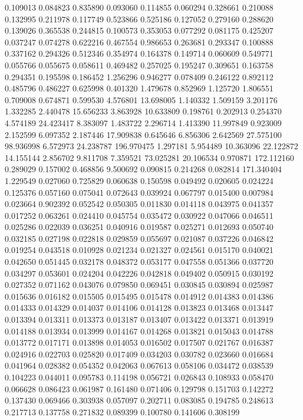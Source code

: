 0.109013
0.084823
0.835890
0.093060
0.114855
0.060294
0.328661
0.210088
0.132995
0.211978
0.117749
0.523866
0.525186
0.127052
0.279160
0.288620
0.139026
0.365538
0.244815
0.100573
0.353053
0.077292
0.081175
0.425207
0.037247
0.074278
0.622216
0.467554
0.986653
0.263681
0.293347
0.100888
0.337162
0.294326
0.512346
0.354974
0.164378
0.149714
0.060609
0.549771
0.055766
0.055675
0.058611
0.469482
0.257025
0.195247
0.309651
0.163758
0.294351
0.195598
0.186452
1.256296
0.946277
0.078409
0.246122
0.892112
0.485796
0.486227
0.625998
0.401320
1.479678
0.852969
1.125720
1.806551
0.709008
0.674871
0.599530
4.576801
13.698005
1.140332
1.509159
3.201176
1.332285
2.440478
15.656233
3.863928
10.633809
0.198761
0.202913
0.254370
4.574189
24.423417
8.383097
1.483722
2.296714
1.413390
11.997849
0.923009
2.152599
6.097352
2.187446
17.909838
0.645646
6.856306
2.642569
27.575100
98.936998
6.572973
24.238787
196.970475
1.297181
5.954489
10.363096
22.122872
14.155144
2.856702
9.811708
7.359521
73.025281
20.106534
0.970871
172.112160
0.289029
0.157002
0.468856
9.500692
0.090815
0.214268
0.082814
171.340404
1.229549
0.027060
0.725829
0.060638
0.150598
0.049492
0.020605
0.024224
0.125376
0.057160
0.075041
0.072643
0.039924
0.067797
0.015400
0.007984
0.023664
0.902392
0.052542
0.050305
0.011830
0.014118
0.043975
0.041357
0.017252
0.063261
0.024410
0.045754
0.035472
0.030922
0.047066
0.046511
0.025286
0.022039
0.036251
0.040916
0.019587
0.025271
0.012693
0.050740
0.032185
0.027198
0.022818
0.029859
0.055697
0.021087
0.037226
0.046842
0.019254
0.043518
0.010928
0.021234
0.021327
0.024561
0.015170
0.040021
0.042650
0.051445
0.032178
0.048372
0.053177
0.047558
0.051366
0.037720
0.034297
0.053601
0.024204
0.042226
0.042818
0.049402
0.050915
0.030192
0.027352
0.071162
0.043076
0.079850
0.069451
0.030845
0.030894
0.025987
0.015636
0.016182
0.015505
0.015495
0.015478
0.014912
0.014383
0.014386
0.014333
0.014329
0.014037
0.014106
0.014128
0.013823
0.013468
0.013447
0.013394
0.013311
0.013373
0.013187
0.013407
0.013422
0.013371
0.013919
0.014188
0.013934
0.013999
0.014167
0.014268
0.013821
0.015043
0.014788
0.013772
0.017171
0.013898
0.014053
0.016502
0.017507
0.021767
0.016387
0.024916
0.022703
0.025820
0.017409
0.034203
0.030782
0.023660
0.016684
0.041964
0.028382
0.054352
0.042063
0.067613
0.058106
0.034472
0.038539
0.104223
0.044011
0.095783
0.114198
0.056721
0.026843
0.108933
0.058470
0.066628
0.086423
0.061987
0.161480
0.071406
0.129798
0.151703
0.142272
0.137430
0.069466
0.303938
0.057097
0.202711
0.083085
0.194785
0.248613
0.217713
0.137758
0.271832
0.089399
0.100780
0.141606
0.308199
